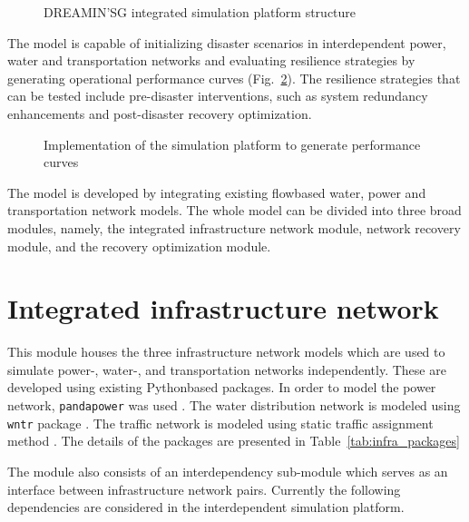 \documentclass[letterpaper,12pt,english]{sphinxmanual}
\begin{document}
\begin{figure}[htbp]
\centering
\capstart
\noindent{}
\caption{DREAMIN’SG integrated simulation platform structure}\label{fig:framework}\end{figure}

\sphinxAtStartPar
The model is capable of initializing disaster scenarios in interdependent power, water and transportation networks and evaluating resilience strategies by generating operational performance curves (Fig.~\ref{fig:perf_curves}). The resilience strategies that can be tested include pre-disaster interventions, such as system redundancy enhancements and post-disaster recovery optimization.

\begin{figure}[htbp]
\centering
\capstart

\noindent{}
\caption{Implementation of the simulation platform to generate performance curves}\label{fig:perf_curves}\end{figure}

\sphinxAtStartPar
The model is developed by integrating existing flow\sphinxhyphen{}based water, power and transportation network models. The whole model can be divided into three broad modules, namely, the integrated infrastructure network module, network recovery module, and the recovery optimization module.


\section{Integrated infrastructure network}
\label{\detokenize{index:integrated-infrastructure-network}}
\sphinxAtStartPar
This module houses the three infrastructure network models which are used to simulate power-, water-, and transportation networks independently.  These are developed using existing Python\sphinxhyphen{}based packages. In order to model the power network, \texttt{pandapower} was used \cite{Thurner2018}. The water distribution network is modeled using \texttt{wntr} package \cite{Klise2020}. The traffic network is modeled using static traffic assignment method \cite{Boyles2020}. The details of the packages are presented in Table~\ref{tab:infra_packages}

The module also consists of an interdependency sub-module which serves as an interface between infrastructure network pairs. Currently the following dependencies are considered in the interdependent simulation platform.
\end{document}
